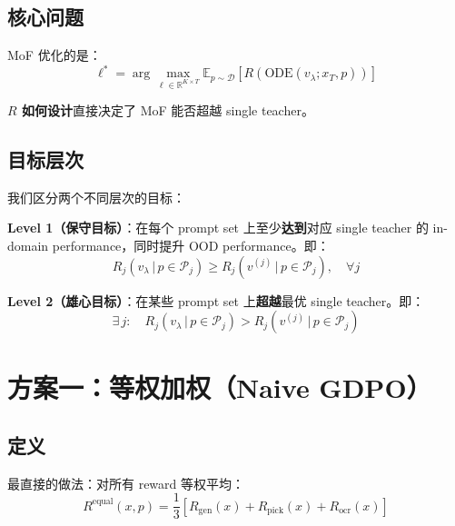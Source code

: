 \documentclass[11pt,a4paper]{article}
\newcommand{\E}{\mathbb{E}}
\newcommand{\R}{\mathbb{R}}
\newcommand{\reward}{R}
\theoremstyle{definition}
\begin{document}
\subsection{核心问题}

MoF 优化的是：
\begin{equation}
\ell^* = \arg\max_{\ell \in \R^{K \times T}} \E_{p \sim \mathcal{D}}\left[\reward\!\left(\mathrm{ODE}(v_\lambda; x_T, p)\right)\right]
\end{equation}

\textbf{$\reward$ 如何设计}直接决定了 MoF 能否超越 single teacher。

\subsection{目标层次}

我们区分两个不同层次的目标：

\begin{tcolorbox}[colback=blue!5, colframe=blue!40]
\textbf{Level 1（保守目标）}：在每个 prompt set 上至少\textbf{达到}对应 single teacher 的 in-domain performance，同时提升 OOD performance。即：
\begin{equation}
R_j(v_\lambda \,|\, p \in \mathcal{P}_j) \geq R_j(v^{(j)} \,|\, p \in \mathcal{P}_j), \quad \forall j
\end{equation}

\textbf{Level 2（雄心目标）}：在某些 prompt set 上\textbf{超越}最优 single teacher。即：
\begin{equation}
\exists\, j: \quad R_j(v_\lambda \,|\, p \in \mathcal{P}_j) > R_j(v^{(j)} \,|\, p \in \mathcal{P}_j)
\end{equation}
\end{tcolorbox}

\section{方案一：等权加权（Naive GDPO）}
\label{sec:equal_weight}

\subsection{定义}

最直接的做法：对所有 reward 等权平均：
\begin{equation}
\reward^{\mathrm{equal}}(x, p) = \frac{1}{3}\left[R_{\mathrm{gen}}(x) + R_{\mathrm{pick}}(x) + R_{\mathrm{ocr}}(x)\right]
\label{eq:equal_reward}
\end{equation}
\end{document}
